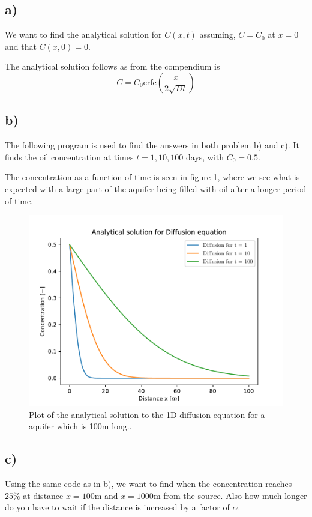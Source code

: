 \documentclass[10pt, a4paper]{amsart}
\newcommand{\erfc}{\text{erfc}}
\begin{document}
\subsection{a)}
We want to find the analytical solution for $C(x,t)$ assuming, $C = C_0$ at $x = 0$ and that $C(x,0) = 0$. 

The analytical solution follows as from the compendium\cite{comp} is 
\begin{equation}
	C = C_0\erfc\left(\frac{x}{2\sqrt{Dt}}\right)
\end{equation}
\subsection{b)}
The following program is used to find the answers in both problem b) and c). It finds the oil concentration at times $t = 1, 10, 100$ days, with $C_0 = 0.5$. 


The concentration as a function of time is seen in figure \ref{fig:2b}, where we see what is expected with a large part of the aquifer being filled with oil after a longer period of time. 
\begin{figure}[]
	\centering
	\includegraphics[width=0.9\linewidth]{"../code/FTCS2.pdf"}
	\caption{Plot of the analytical solution to the 1D diffusion equation for a aquifer which is 100m long..}
	\label{fig:2b}
\end{figure}
\subsection{c)}
Using the same code as in b), we want to find when the concentration reaches $25\%$ at distance $x = 100$m and $x = 1000$m from the source. Also how much longer do you have to wait if the distance is increased by a factor of $\alpha$. 
\end{document}
